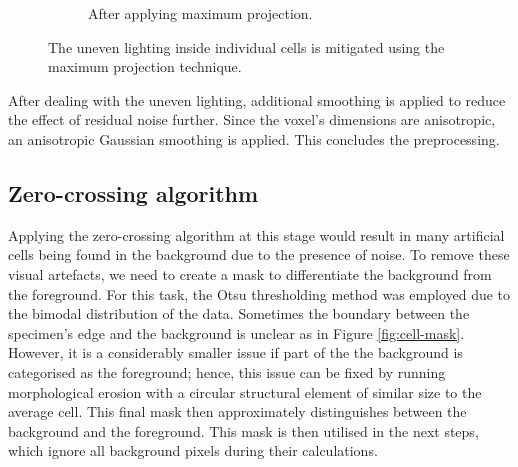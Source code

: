 \documentclass[
  digital,     %
  oneside,     %
  nosansbold,  %
  nocolorbold, %
  lof,         %
  lot,         %
]{fithesis4}
\begin{document}
\begin{figure}
\begin{subfigure}[t]{0.45\linewidth}
        \caption{After applying maximum projection.}
    \end{subfigure}
    \caption{The uneven lighting inside individual cells is mitigated using the
    maximum projection technique.}
    \label{fig:max-proj}
\end{figure}

After dealing with the uneven lighting, additional smoothing is applied
to reduce the effect of residual noise further. Since the voxel's dimensions are
anisotropic, an anisotropic Gaussian smoothing is applied. This concludes the
preprocessing.

\subsection{Zero-crossing algorithm}
Applying the zero-crossing algorithm at this stage would result in many
artificial cells being found in the background due to the presence of noise. To
remove these visual artefacts, we need to create a mask to differentiate the
background from the foreground. For this task, the Otsu thresholding method was
employed due to the bimodal distribution of the data. Sometimes the boundary between
the specimen's edge and the background is unclear as in Figure
\ref{fig:cell-mask}. However, it is a considerably smaller issue if part of the
the background is categorised as the foreground; hence, this issue can be fixed by
running morphological erosion with a circular structural element of similar size
to the average cell. This final mask then approximately distinguishes between the 
background and the foreground. This mask is then utilised in the next steps, which
ignore all background pixels during their calculations.
\end{document}
